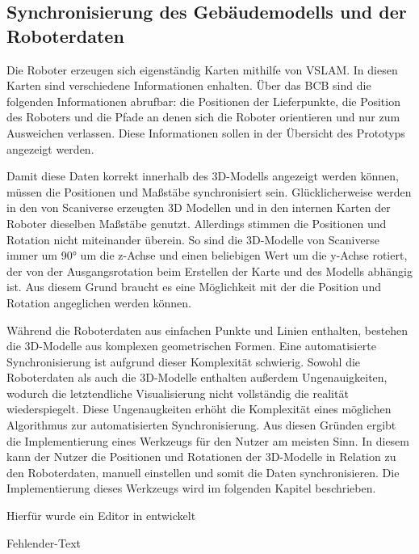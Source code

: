 \subsection{Synchronisierung des Gebäudemodells und der Roboterdaten}
Die Roboter erzeugen sich eigenständig Karten mithilfe von \ac{VSLAM}. In diesen Karten sind verschiedene Informationen enhalten. Über das \ac{BCB} sind die folgenden Informationen abrufbar: die Positionen der Lieferpunkte, die Position des Roboters und die Pfade an denen sich die Roboter orientieren und nur zum Ausweichen verlassen. Diese Informationen sollen in der Übersicht des Prototyps angezeigt werden.

Damit diese Daten korrekt innerhalb des 3D-Modells angezeigt werden können, müssen die Positionen und Maßstäbe synchronisiert sein. Glücklicherweise werden in den von Scaniverse erzeugten 3D Modellen und in den internen Karten der Roboter dieselben Maßstäbe genutzt. Allerdings stimmen die Positionen und Rotation nicht miteinander überein. So sind die 3D-Modelle von Scaniverse immer um 90° um die z-Achse und einen beliebigen Wert um die y-Achse rotiert, der von der Ausgangsrotation beim Erstellen der Karte und des Modells abhängig ist. Aus diesem Grund braucht es eine Möglichkeit mit der die Position und Rotation angeglichen werden können.

Während die Roboterdaten aus einfachen Punkte und Linien enthalten, bestehen die 3D-Modelle aus komplexen geometrischen Formen. Eine automatisierte Synchronisierung ist aufgrund dieser Komplexität schwierig. Sowohl die Roboterdaten als auch die 3D-Modelle enthalten außerdem Ungenauigkeiten, wodurch die letztendliche Visualisierung nicht vollständig die realität wiederspiegelt. Diese Ungenaugkeiten erhöht die Komplexität eines möglichen Algorithmus zur automatisierten Synchronisierung. Aus diesen Gründen ergibt die Implementierung eines Werkzeugs für den Nutzer am meisten Sinn. In diesem kann der Nutzer die Positionen und Rotationen der 3D-Modelle in Relation zu den Roboterdaten, manuell einstellen und somit die Daten synchronisieren. Die Implementierung dieses Werkzeugs wird im folgenden Kapitel beschrieben.





Hierfür wurde ein Editor in \deckgl entwickelt 

Fehlender-Text
